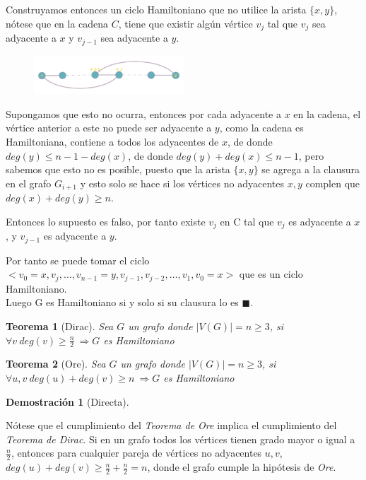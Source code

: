 \documentclass[a4paper,1pt]{report}
\newtheorem*{teo}{Teorema}
\newtheorem*{dem}{Demostración}
\begin{document}
Construyamos entonces un ciclo Hamiltoniano que no utilice la arista $\{x,y\}$, n\'otese que en la cadena $C$, tiene que existir alg\'un v\'ertice $v_j$ tal que $v_j$ sea adyacente a $x$ y $v_{j-1}$ sea adyacente a $y$.

\begin{figure}[H]
    \centering
    \includegraphics[width=0.5\textwidth]{figures4/clausura_demo.png}
\end{figure} 

Supongamos que esto no ocurra, entonces por cada adyacente a $x$ en la cadena, el v\'ertice anterior a este no puede ser adyacente a $y$, como la cadena es Hamiltoniana, contiene a todos los adyacentes de $x$, de donde $deg(y) \leq n - 1 - deg(x)$, de donde $deg(y) + deg(x) \leq n -1$, pero sabemos que esto no es posible, puesto que la arista $\{x,y\}$ se agrega a la clausura en el grafo $G_{i+1}$ y esto solo se hace si los v\'ertices no adyacentes $x,y$ complen que $deg(x) + deg(y) \geq n$.

Entonces lo supuesto es falso, por tanto existe $v_{j}$ en C tal que $v_j$ es adyacente a $x$, y $v_{j-1}$ es adyacente a $y$. 

Por tanto se puede tomar el ciclo $<v_0=x,v_{j},\dots,v_{n-1}=y,v_{j -1},v_{j-2},\dots,v_1,v_0=x>$ que es un ciclo Hamiltoniano.\\

Luego G es Hamiltoniano si y solo si su clausura lo es $\blacksquare$.

\begin{teo}[Dirac]
    Sea $G$ un grafo donde $|V(G)|= n\geq 3$, si $\forall v~ deg(v) \geq \frac{n}{2} ~ \Rightarrow G$ es Hamiltoniano 
\end{teo}

\begin{teo}[Ore]
    Sea $G$ un grafo donde $|V(G)|= n\geq 3$, si $\forall u,v~ deg(u) + deg(v) \geq n ~ \Rightarrow G$ es Hamiltoniano 
\end{teo}

\begin{dem}[Directa]\end{dem}

N\'otese que el cumplimiento del \textit{Teorema de Ore} implica el cumplimiento del \textit{Teorema de Dirac}. 
Si en un grafo todos los v\'ertices tienen grado mayor o igual a $\frac{n}{2}$, entonces para cualquier pareja de v\'ertices no adyacentes $u, v$, $deg(u) + deg(v) \geq \frac{n}{2} + \frac{n}{2} = n$, donde el grafo cumple la hip\'otesis de \textit{Ore}.
\end{document}
